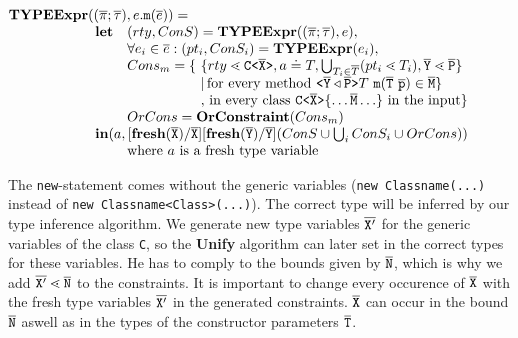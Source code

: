 \documentclass[a4paper,USenglish,cleveref, autoref, thm-restate]{lipics-v2021}
\begin{document}
\smallskip

\noindent
$\begin{array}{@{}l@{}l}
\typeExpr{} & (\typeAssumptions, e.\mathtt{m}(\overline{e}) ) = \\
& \begin{array}{ll}
\textbf{let}& %
(rty, ConS) = \typeExpr(\typeAssumptions, e),\\
& \forall e_i \in \overline{e} : (pt_i, ConS_i) = \typeExpr(e_i)  ,\\
& \begin{array}{@{}l@{}l}
        Cons_{m} = \{\ & \set{ rty \lessdot \exptype{C}{\ol{X}}, a \doteq T, \bigcup_{T_i \in \overline{T}} (pt_i \lessdot T_i)
        , \ol{Y} \lessdot \ol{P} }\\
                    & |\, \text{for every method}\ \exptype{}{\ol{Y} \triangleleft \ol{P}} T\ \texttt{m}(\ol{T}\  \ol{p}) \in \ol{M} \} \\%
                    & ,\, \text{in every class}\ \exptype{C}{\ol{X}} \{ \ldots \ol{M} \ldots \}\ \text{in the input} \} 
\end{array}\\
& OrCons = \textbf{OrConstraint}(Cons_{m})\\
\multicolumn{2}{l}{\mathbf{in} (a, [\textbf{fresh}(\ol{X})/\ol{X}][\textbf{fresh}(\ol{Y})/\ol{Y}](ConS \cup \bigcup_i ConS_i \cup OrCons))}\\
& \text{where\ } a \text{\ is\ a\ fresh\
  type\ variable}\\ 
\end{array}
\end{array}
$

\smallskip

The \texttt{new}-statement comes without the generic variables
(\texttt{new Classname(...)} instead of \texttt{new Classname<Class>(...)}).
The correct type will be inferred by our type inference algorithm.
We generate new type variables $\overline{\tt X'}$ for the generic variables of the class \texttt{C},
so the \textbf{Unify} algorithm can later set in the correct types for these variables.
He has to comply to the bounds given by $\overline{\tt N}$, which is why we add $\overline{\tt X'} \lessdot \overline{\tt N}$ to the constraints.
It is important to change every occurence of $\overline{\tt X}$ with the fresh type variables $\overline{\tt X'}$ in the generated constraints.
$\overline{\tt X}$ can occur in the bound $\overline{\tt N}$ aswell as in the types of the constructor parameters $\overline{\tt T}$.
\end{document}
